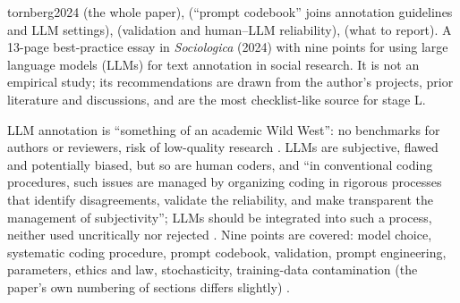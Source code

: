 \begin{papercard}{tornberg2024}
  (the whole paper),  (``prompt codebook'' joins annotation guidelines and LLM settings),  (validation and human--LLM reliability),  (what to report). A 13-page best-practice essay in \emph{Sociologica} (2024) with nine points for using large language models (LLMs) for text annotation in social research. It is not an empirical study; its recommendations are drawn from the author's projects, prior literature and discussions, and are the most checklist-like source for stage L.

 LLM annotation is ``something of an academic Wild West'': no benchmarks for authors or reviewers, risk of low-quality research . LLMs are subjective, flawed and potentially biased, but so are human coders, and ``in conventional coding procedures, such issues are managed by organizing coding in rigorous processes that identify disagreements, validate the reliability, and make transparent the management of subjectivity''; LLMs should be integrated into such a process, neither used uncritically nor rejected . Nine points are covered: model choice, systematic coding procedure, prompt codebook, validation, prompt engineering, parameters, ethics and law, stochasticity, training-data contamination (the paper's own numbering of sections differs slightly) .


\end{papercard}
